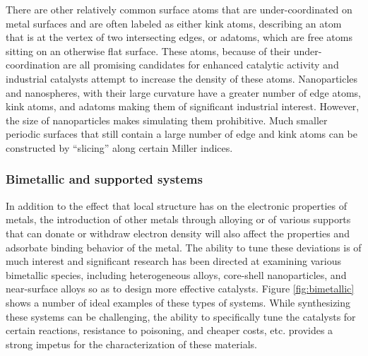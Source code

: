 There are other relatively common surface atoms that are under-coordinated on
metal surfaces and are often labeled as either kink atoms, describing an atom
that is at the vertex of two intersecting edges, or adatoms, which are free
atoms sitting on an otherwise flat surface. These atoms, because of their
under-coordination are all promising candidates for enhanced catalytic activity
and industrial catalysts attempt to increase the density of these atoms.
Nanoparticles and nanospheres, with their large curvature have a greater number
of edge atoms, kink atoms, and adatoms making them of significant industrial
interest.  However, the size of nanoparticles makes simulating them
prohibitive. Much smaller periodic surfaces that still contain a large number
of edge and kink atoms can be constructed by ``slicing'' along certain Miller
indices.

\subsubsection{Bimetallic and supported systems}
In addition to the effect that local structure has on the electronic properties
of metals, the introduction of other metals through alloying or of various
supports that can donate or withdraw electron density will also affect the
properties and adsorbate binding behavior of the metal. The ability to tune
these deviations is of much interest and significant research has been directed
at examining various bimetallic species, including heterogeneous
alloys,\citep{Stamenkovic:2007kk, Yu:2013fr} core-shell
nanoparticles,\citep{Tao:2008aa, Wang:2015qb, Huang:2012ul} and near-surface
alloys\citep{Jan-Knudsen:2007fe,Stephens:2011bv} so as to design more effective
catalysts.  Figure \ref{fig:bimetallic} shows a number of ideal examples of
these types of systems. While synthesizing these systems can be challenging,
the ability to specifically tune the catalysts for certain reactions,
resistance to poisoning\citep{Sharma:0ly, Yu:2013fr}, and cheaper
costs\citep{Li:0hl, Zhao:0qf}, etc. provides a strong impetus for the
characterization of these materials.


